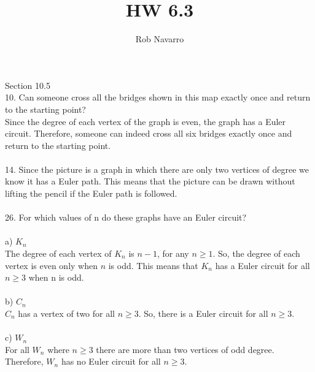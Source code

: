\documentclass[11pt, oneside]{article}   	%
\title{HW 6.3}
\author{Rob Navarro}
\begin{document}
\maketitle

\noindent
Section 10.5\\
10. Can someone cross all the bridges shown in this map exactly once and return to the starting point?\\
Since the degree of each vertex of the graph is even, the graph has a Euler circuit. Therefore, someone can indeed cross all six bridges exactly once and return to the starting point. \\\\
14. Since the picture is a graph in which there are only two vertices of degree we know it has a Euler path. This means that the picture can be drawn without lifting the pencil if the Euler path is followed. \\\\
26. For which values of n do these graphs have an Euler circuit?\\\\
a) $K_n$\\
The degree of each vertex of $K_n$ is $n - 1$, for any $n\geq 1$. So, the degree of each vertex is even only when $n$ is odd. This means that $K_n$ has a Euler circuit for all $n\geq 3$ when n is odd. \\\\
b) $C_n$\\
$C_n$ has a vertex of two for all $n\geq 3$. So, there is a Euler circuit for all $n\geq 3$. \\\\
c) $W_n$\\
For all $W_n$ where $n\geq 3$ there are more than two vertices of odd degree. Therefore, $W_n$ has no Euler circuit for all $n\geq 3$. 
\end{document}
